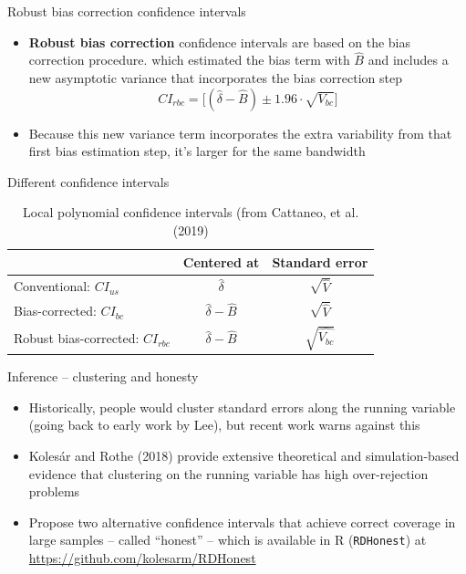 \documentclass{beamer}
\begin{document}
\begin{frame}{Robust bias correction confidence intervals}

\begin{itemize}
\item \textbf{Robust bias correction} confidence intervals are based on the bias correction procedure. which estimated the bias term with $\widehat{B}$ and includes a new asymptotic variance that incorporates the bias correction step  $$CI_{rbc}=\bigg [ ( \widehat{\delta} - \widehat{B} ) \pm 1.96 \cdot \sqrt{V_{bc}} \bigg ]$$
\item Because this new variance term incorporates the extra variability from that first bias estimation step, it's larger for the same bandwidth
\end{itemize}
\end{frame}


\begin{frame}{Different confidence intervals}


\begin{table}[htbp]\centering
\caption{Local polynomial confidence intervals (from Cattaneo, et al. (2019)}
\centering
\begin{tabular}{l*{2}{c}}
\toprule
\multicolumn{1}{l}{\textbf{}}&
\multicolumn{1}{c}{\textbf{Centered at}}&
\multicolumn{1}{c}{\textbf{Standard error}}\\
\midrule
Conventional: $CI_{us}$	& $\widehat{\delta}$	& $\sqrt{\widehat{V}}$ \\
Bias-corrected: $CI_{bc}$	& $\widehat{\delta} - \widehat{B}$	& $\sqrt{\widehat{V}}$ \\
Robust bias-corrected: $CI_{rbc}$	& $\widehat{\delta} - \widehat{B}$	& $\sqrt{\widehat{V_{bc}}}$ \\
\bottomrule
\end{tabular}
\end{table}

\end{frame}



\begin{frame}{Inference -- clustering and honesty}

\begin{itemize}
\item Historically, people would cluster standard errors along the running variable (going back to early work by Lee), but recent work warns against this
\item Koles\'ar and Rothe (2018) provide extensive theoretical and simulation-based evidence that clustering on the running variable has high over-rejection problems
\item Propose two alternative confidence intervals that achieve correct coverage in large samples -- called ``honest'' -- which is available in R (\texttt{RDHonest}) at \url{https://github.com/kolesarm/RDHonest}
\end{itemize}

\end{frame}
\end{document}
